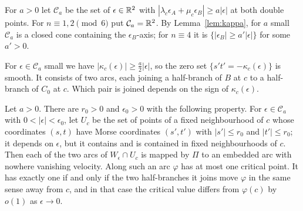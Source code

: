 \begin{definition}\label{def:cone}
For $a>0$ let $\mathcal C_a$ be the set of $\epsilon\in\mathbb{R}^2$ with $|\lambda_c\epsilon_A+\mu_c\epsilon_B|\ge a|\epsilon|$ at both double points.
For $n\equiv1,2\pmod 6$ put $\mathcal C_a=\mathbb{R}^2$. By Lemma~\ref{lem:kappa}, for $a$ small $\mathcal C_a$ is a closed cone
containing the $\epsilon_B$-axis; for $n\equiv4$ it is $\{|\epsilon_B|\ge a'|\epsilon|\}$ for some $a'>0$.
\end{definition}

For $\epsilon\in\mathcal C_a$ small we have $|\kappa_c(\epsilon)|\ge\frac a2|\epsilon|$, so the zero set $\{s't'=-\kappa_c(\epsilon)\}$ is smooth.
It consists of two arcs, each joining a half-branch of $B$ at $c$ to a half-branch of $C_0$ at $c$. Which pair is
joined depends on the sign of $\kappa_c(\epsilon)$.

\begin{lemma}\label{lem:resolved}
Let $a>0$. There are $r_0>0$ and $\epsilon_0>0$ with the following property. For $\epsilon\in\mathcal C_a$ with $0<|\epsilon|<\epsilon_0$, let
$U_c$ be the set of points of a fixed neighbourhood of $c$ whose coordinates $(s,t)$ have Morse coordinates $(s',t')$ with
$|s'|\le r_0$ and $|t'|\le r_0$; it depends on $\epsilon$, but it contains and is contained in fixed neighbourhoods of $c$.
Then each of the two arcs of $W_\epsilon\cap U_c$ is mapped by $\Pi$ to an embedded arc with nowhere vanishing velocity. Along
such an arc $\varphi$ has at most one critical point. It has exactly one if and only if the two half-branches it
joins move $\varphi$ in the same sense away from $c$, and in that case the critical value differs from $\varphi(c)$ by
$o(1)$ as $\epsilon\to0$.
\end{lemma}

